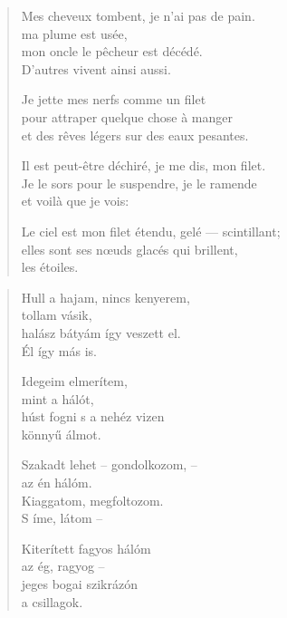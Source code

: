 \documentclass[11pt]{extbook}
\newcommand*{\centeredornament}{\centerline{\pgfornament[width=6cm]{88}}}
\begin{document}
\newpage


\vspace*{-15mm}
\centeredornament



\begin{verse}
  Mes cheveux tombent, je n'ai pas de pain. \\
  ma plume est usée, \\
  mon oncle le pêcheur est décédé. \\
  D'autres vivent ainsi aussi.

  Je jette mes nerfs comme un filet \\
  pour attraper quelque chose à manger \\
  et des rêves légers sur des eaux pesantes.

  Il est peut-être déchiré, je me dis, mon filet. \\
  Je le sors pour le suspendre, je le ramende \\
  et voilà que je vois:

  Le ciel est mon filet étendu, gelé --- scintillant;\hspace*{-1mm} \\
  elles sont ses nœuds glacés qui brillent, \\
  les étoiles.
\end{verse}

\newpage

\vspace*{-15mm}
\centeredornament



\begin{verse}
  Hull a hajam, nincs kenyerem, \\
  tollam vásik, \\
  halász bátyám így veszett el. \\
  Él így más is.

  Idegeim elmerítem, \\
  mint a hálót, \\
  húst fogni s a nehéz vizen \\
  könnyű álmot.

  Szakadt lehet -- gondolkozom, -- \\
  az én hálóm. \\
  Kiaggatom, megfoltozom. \\
  S íme, látom --

  Kiterített fagyos hálóm \\
  az ég, ragyog -- \\
  jeges bogai szikrázón \\
  a csillagok.
\end{verse}
\end{document}
